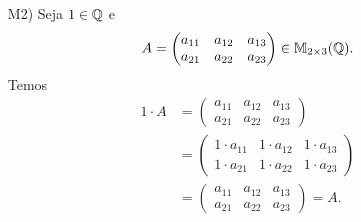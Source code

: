 \begin{exemplo}
\begin{enumerate}[label={\arabic*})]
\begin{solucao}
\begin{itemize}
				      \item[M2)] Seja $1 \in \mathbb{Q}$ e
					      \[
						      A = \begin{pmatrix} a_{11} & a_{12} & a_{13}\\a_{21} & a_{22} & a_{23}\end{pmatrix} \in \mathbb{M}_{2 \times 3}(\mathbb{Q}).
					      \]
					      Temos
					      \begin{align*}
						      1\cdot A & = \begin{pmatrix} a_{11} & a_{12} & a_{13}\\a_{21} & a_{22} & a_{23}\end{pmatrix}
						      \\ &= \begin{pmatrix} 1\cdot a_{11} & 1\cdot a_{12} & 1\cdot a_{13}\\1\cdot a_{21} & 1\cdot a_{22} & 1\cdot a_{23}\end{pmatrix}
						      \\ &= \begin{pmatrix} a_{11} & a_{12} & a_{13}\\a_{21} & a_{22} & a_{23}\end{pmatrix} = A.
					      \end{align*}


\end{itemize}
\end{solucao}
\end{enumerate}
\end{exemplo}
